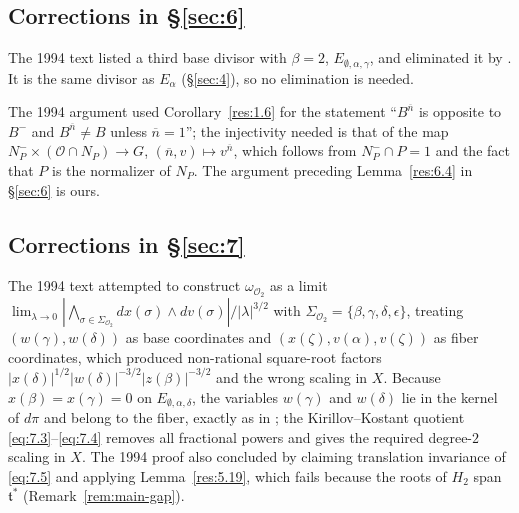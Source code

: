 \documentclass[12pt,letterpaper]{amsart}
\theoremstyle{plain}
\theoremstyle{definition}
\theoremstyle{remark}
\theoremstyle{definition}
\begin{document}
\subsection*{Corrections in \S\ref{sec:6}}

\begin{rem26}\label{rem:6.three}
The 1994 text listed a third base divisor with $\beta=2$,
$E_{\emptyset,\alpha,\gamma}$, and eliminated it by
\cite[Ch.~V, Lemma~1.1]{Ha92a}. It is the same divisor as $E_\alpha$
(\S\ref{sec:4}), so no elimination is needed.
\end{rem26}

\begin{rem26}\label{rem:6.4}
The 1994 argument used Corollary~\ref{res:1.6} for the statement
``$B^{\overline n}$ is opposite to $B^-$ and $B^{\overline n}\neq B$ unless
$\overline n=1$''; the injectivity needed is that of the map
$N_P^-\times({\mathcal O}\cap N_P)\to G$, $(\overline n,v)\mapsto
v^{\overline n}$, which follows from $N_P^-\cap P=1$ and the fact that
$P$ is the normalizer of $N_P$. The argument preceding Lemma~\ref{res:6.4} in \S\ref{sec:6} is ours.
\end{rem26}

\subsection*{Corrections in \S\ref{sec:7}}

\begin{rem26}\label{rem:7.3}
The 1994 text attempted to construct $\omega_{\mathcal O_2}$ as a limit
$\lim_{\lambda\to0}|\bigwedge_{\sigma\in\Sigma_{\mathcal O_2}}dx(\sigma)\wedge dv(\sigma)|/|\lambda|^{3/2}$
with $\Sigma_{\mathcal O_2}=\{\beta,\gamma,\delta,\epsilon\}$, treating
$(w(\gamma),w(\delta))$ as base coordinates and $(x(\zeta),v(\alpha),v(\zeta))$
as fiber coordinates, which produced non-rational square-root factors
$|x(\delta)|^{1/2}|w(\delta)|^{-3/2}|z(\beta)|^{-3/2}$ and the wrong scaling in
$X$. Because $x(\beta)=x(\gamma)=0$ on $E_{\emptyset,\alpha,\delta}$, the
variables $w(\gamma)$ and $w(\delta)$ lie in the kernel of $d\pi$ and belong to
the fiber, exactly as in \cite[\S6, pp.~239--240]{Ha89}; the Kirillov--Kostant
quotient \eqref{eq:7.3}--\eqref{eq:7.4} removes all fractional powers and gives
the required degree-$2$ scaling in $X$. The 1994 proof also concluded by
claiming translation invariance of \eqref{eq:7.5} and applying
Lemma~\ref{res:5.19}, which fails because the roots of $H_2$ span
$\mathfrak t^*$ (Remark~\ref{rem:main-gap}).
\end{rem26}
\end{document}
